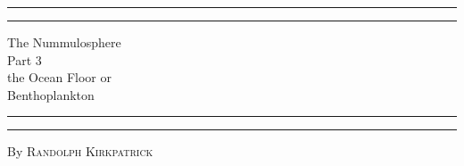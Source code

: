 \documentclass[a4paper, 12pt, oneside]{article}
\begin{document}
\renewcommand{\thefigure}{\Fontauri{\arabic{figure}}}
\renewcommand\thefootnote{\Fontauri{\arabic{footnote}}}
\let\oldfootnote\footnote
    \renewcommand{\footnote}[1]{\oldfootnote{\Fontauri\large#1}}
\begin{titlepage} %
	\centering %
	\scshape %

	
	\rule{\textwidth}{1.6pt}\vspace*{-\baselineskip}\vspace*{2pt} %
	\rule{\textwidth}{0.4pt} %
	
	\vspace{0.75\baselineskip} %
	
	{\Huge The Nummulosphere\\ Part 3\\ the Ocean Floor or\\ Benthoplankton\\} %
	
	\vspace{0.75\baselineskip} %
	
	\rule{\textwidth}{0.4pt}\vspace*{-\baselineskip}\vspace{3.2pt} %
	\rule{\textwidth}{1.6pt} %
	
	\vspace{1\baselineskip} %
	
	
	{By \scshape\Large Randolph Kirkpatrick\\} %
	
	\vspace*{1\baselineskip} %
	
	
	\vspace{1\baselineskip} %

	

\end{titlepage}
\end{document}
